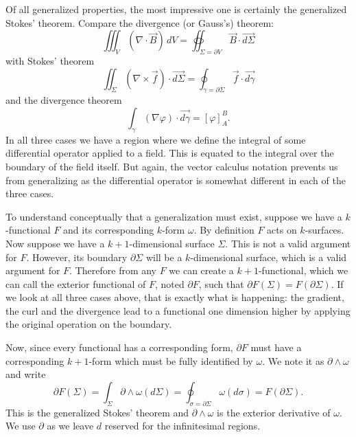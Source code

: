 \documentclass[fleqn,10pt]{wlscirep}
\begin{document}
Of all generalized properties, the most impressive one is certainly the generalized Stokes' theorem. Compare the divergence (or Gauss's) theorem:
\begin{equation*}
	\iiint_V (\nabla \cdot \vec{B}) \, dV = \oiint_{\Sigma = \partial V} \vec{B} \cdot \vec{d\Sigma}
\end{equation*}
with Stokes' theorem
\begin{equation*}
	\iint_\Sigma (\nabla \times \vec{f}) \cdot \vec{d\Sigma} = \oint_{\gamma = \partial \Sigma} \vec{f} \cdot \vec{d\gamma}
\end{equation*}
and the divergence theorem
\begin{equation*}
	\int_\gamma (\nabla \varphi) \cdot \vec{d\gamma} = \left[ \varphi \right]_A^B .
\end{equation*}
In all three cases we have a region where we define the integral of some differential operator applied to a field. This is equated to the integral over the boundary of the field itself. But again, the vector calculus notation prevents us from generalizing as the differential operator is somewhat different in each of the three cases.

To understand conceptually that a generalization must exist, suppose we have a $k$-functional $F$ and its corresponding $k$-form $\omega$. By definition $F$ acts on $k$-surfaces. Now suppose we have a $k+1$-dimensional surface $\Sigma$. This is not a valid argument for $F$. However, its boundary $\partial \Sigma$ will be a $k$-dimensional surface, which is a valid argument for $F$. Therefore from any $F$ we can create a $k+1$-functional, which we can call the exterior functional of $F$, noted $\partial F$, such that $\partial F(\Sigma) = F(\partial \Sigma)$. If we look at all three cases above, that is exactly what is happening: the gradient, the curl and the divergence lead to a functional one dimension higher by applying the original operation on the boundary.

Now, since every functional has a corresponding form, $\partial F$ must have a corresponding $k+1$-form which must be fully identified by $\omega$. We note it as $\partial \wedge \omega$ and write
\begin{equation*}
	\partial F(\Sigma) = \int_\Sigma \partial \wedge \omega(d\Sigma) = \oint_{\sigma = \partial \Sigma} \omega(d\sigma) = F(\partial \Sigma).
\end{equation*}
This is the generalized Stokes' theorem and $\partial \wedge \omega$ is the exterior derivative of $\omega$. We use $\partial$ as we leave $d$ reserved for the infinitesimal regions.
\end{document}
